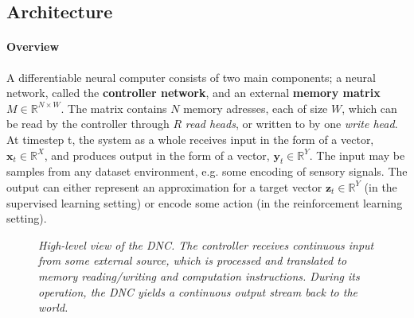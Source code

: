\documentclass[]{article}
\begin{document}
\subsection{Architecture}
\paragraph{Overview} 
A differentiable neural computer consists of two main components; a neural network, called the \textbf{controller network}, and an external \textbf{memory matrix} $M \in \mathbb{R}^{N\times W}$. The matrix contains $N$ memory adresses, each of size $W$, which can be read by the controller through $R$ \textit{read heads}, or written to by one \textit{write head}. At timestep t, the system as a whole receives input in the form of a vector, $\pmb{x}_t \in \mathbb{R}^X$, and produces output in the form of a vector, $\pmb{y}_t \in \mathbb{R}^Y$. The input may be samples from any dataset environment, e.g. some encoding of sensory signals. The output can either represent an approximation for a target vector $\pmb{z}_t \in \mathbb{R}^Y$ (in the supervised learning setting) or encode some action (in the reinforcement learning setting).

\begin{figure}
	\centering
	\caption[]
	{\small \textit{\label{fig:3} High-level view of the DNC. The controller receives continuous input from some external source, which is processed and translated to memory reading/writing and computation instructions. During its operation, the DNC yields a continuous output stream back to the world.}}
\end{figure}
\end{document}

